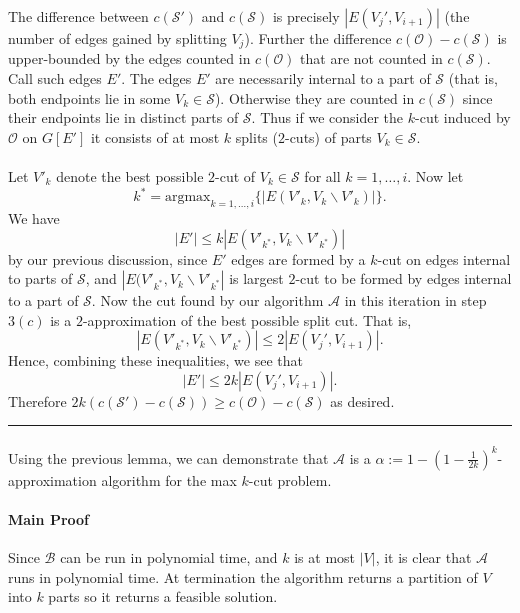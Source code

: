 \documentclass[letterpaper,12pt,oneside,onecolumn]{article}
\newcommand{\cA}{\mathcal{A}} \newcommand{\cB}{\mathcal{B}}
\newcommand{\cO}{\mathcal{O}} \newcommand{\cP}{\mathcal{P}}
\newcommand{\cS}{\mathcal{S}} \newcommand{\cT}{\mathcal{T}}
\newenvironment{proof}{{\bf Proof:  }}{\hfill\rule{2mm}{2mm}}
\begin{document}
\begin{proof}
The difference between $c(\cS')$ and $c(\cS)$ is precisely $|E(V_j', V_{i+1})|$ (the number of edges gained by splitting $V_j$). Further the difference $c(\cO) - c(\cS)$ is upper-bounded by the edges counted in $c(\cO)$ that are not counted in $c(\cS)$. Call such edges $E'$.  The edges $E'$ are necessarily internal to a part of $\cS$ (that is, both endpoints lie in some $V_k \in \cS$). Otherwise they are counted in $c(\cS)$ since their endpoints lie in distinct parts of $\cS$. Thus if we consider the $k$-cut induced by $\cO$ on $G[E']$ it consists of at most $k$ splits ($2$-cuts) of parts $V_k \in \cS$.
\paragraph{}
Let $V'_k$ denote the best possible $2$-cut of $V_k \in \cS$ for all $k = 1, \dots, i$. Now let $$k^* = \text{argmax}_{k=1,\dots,i}  \{|E(V'_k, V_k \backslash V'_k)|\}.$$ We have
$$ |E'| \leq k |E(V'_{k^*}, V_k \backslash V'_{k^*})|$$
by our previous discussion, since $E'$ edges are formed by a $k$-cut on edges internal to parts of $\cS$, and  $|E(V'_{k^*}, V_k \backslash V'_{k^*}|$ is largest $2$-cut to be formed by edges internal to a part of $\cS$. Now the cut found by our algorithm $\cA$ in this iteration in step $3(c)$ is a $2$-approximation of the best possible split cut. That is,
$$|E(V'_{k^*}, V_k \backslash V'_{k^*})| \leq 2|E(V_j', V_{i+1})| .$$
Hence, combining these inequalities, we see that
$$|E'| \leq 2k |E(V_j', V_{i+1})|.$$
Therefore $2k(c(\cS') - c(\cS)) \geq c(\cO) - c(\cS)$ as desired.
\end{proof}
\paragraph{}
Using the previous lemma, we can demonstrate that $\cA$ is a $\alpha := 1-(1-\frac{1}{2k})^k$-approximation algorithm for the max $k$-cut problem.
\paragraph{Main Proof}
Since $\cB$ can be run in polynomial time, and $k$ is at most $|V|$, it is clear that $\cA$ runs in polynomial time. At termination the algorithm returns a partition of $V$ into $k$ parts so it returns a feasible solution.
\end{document}
